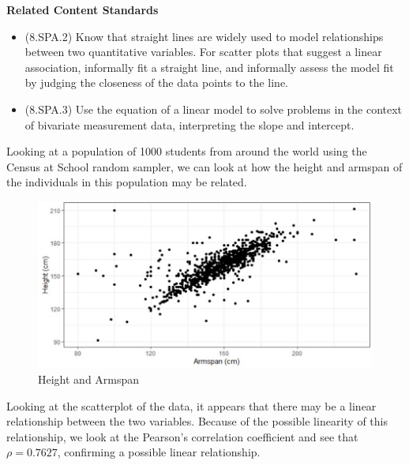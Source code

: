 \documentclass[
]{book}
\providecommand{\tightlist}{%
  \setlength{\itemsep}{0pt}\setlength{\parskip}{0pt}}
\newenvironment{standards}{}{}
\theoremstyle{definition}
\theoremstyle{definition}
\theoremstyle{definition}
\theoremstyle{definition}
\theoremstyle{remark}
\begin{document}
\begin{standards}

\begin{center}
\textbf{Related Content Standards}

\end{center}

\begin{itemize}
\tightlist
\item
  (8.SPA.2) Know that straight lines are widely used to model relationships between two quantitative variables. For scatter plots that suggest a linear association, informally fit a straight line, and informally assess the model fit by judging the closeness of the data points to the line.
\item
  (8.SPA.3) Use the equation of a linear model to solve problems in the context of bivariate measurement data, interpreting the slope and intercept.
\end{itemize}

\end{standards}

Looking at a population of 1000 students from around the world using the Census at School random sampler, we can look at how the height and armspan of the individuals in this population may be related.

\begin{figure}

{\centering \includegraphics[width=0.8\linewidth]{images/Armspan_Height} 

}

\caption{Height and Armspan}\label{fig:unnamed-chunk-201}
\end{figure}

Looking at the scatterplot of the data, it appears that there may be a linear relationship between the two variables. Because of the possible linearity of this relationship, we look at the Pearson's correlation coefficient and see that \(\rho = 0.7627\), confirming a possible linear relationship.
\end{document}
